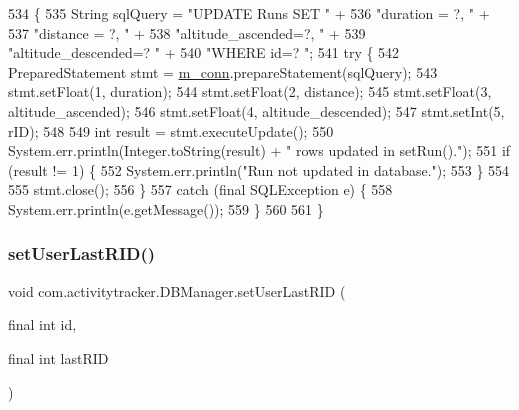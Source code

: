 \begin{DoxyCode}
534                                                                                              \{
535         String sqlQuery = \textcolor{stringliteral}{"UPDATE Runs SET "} +
536                 \textcolor{stringliteral}{"duration = ?, "} +
537                 \textcolor{stringliteral}{"distance = ?, "} +
538                 \textcolor{stringliteral}{"altitude\_ascended=?, "} +
539                 \textcolor{stringliteral}{"altitude\_descended=? "} +
540                 \textcolor{stringliteral}{"WHERE id=? "};
541         \textcolor{keywordflow}{try} \{
542             PreparedStatement stmt = \mbox{\hyperlink{classcom_1_1activitytracker_1_1_d_b_manager_a064088d13ac09eb147fdc19268771521}{m\_conn}}.prepareStatement(sqlQuery);
543             stmt.setFloat(1, duration);
544             stmt.setFloat(2, distance);
545             stmt.setFloat(3, altitude\_ascended);
546             stmt.setFloat(4, altitude\_descended);
547             stmt.setInt(5, rID);
548 
549             \textcolor{keywordtype}{int} result = stmt.executeUpdate();
550             System.err.println(Integer.toString(result) + \textcolor{stringliteral}{" rows updated in setRun()."});
551             \textcolor{keywordflow}{if} (result != 1) \{
552                 System.err.println(\textcolor{stringliteral}{"Run not updated in database."});
553             \}
554 
555             stmt.close();
556         \}
557         \textcolor{keywordflow}{catch} (\textcolor{keyword}{final} SQLException e) \{
558             System.err.println(e.getMessage());
559         \}
560 
561     \}
\end{DoxyCode}
\mbox{\label{classcom_1_1activitytracker_1_1_d_b_manager_a93b7fc4c2d0083e125852d84f087a8d3}} 
\subsubsection{\texorpdfstring{set\+User\+Last\+R\+I\+D()}{setUserLastRID()}}
{\footnotesize\ttfamily void com.\+activitytracker.\+D\+B\+Manager.\+set\+User\+Last\+R\+ID (\begin{DoxyParamCaption}\item[{final int}]{id,  }\item[{final int}]{last\+R\+ID }\end{DoxyParamCaption})}

